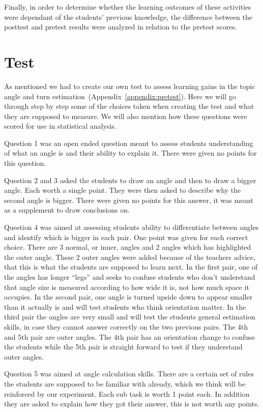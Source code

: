 \bigskip\noindent
Finally, in order to determine whether the learning outcomes of these activities were dependant of the students' previous knowledge, the difference between the posttest and pretest results were analyzed in relation to the pretest scores.

\section{Test}
As mentioned we had to create our own test to assess learning gains in the topic angle and turn estimation~(Appendix~\ref{appendix:pretest}). Here we will go through step by step some of the choices taken when creating the test and what they are supposed to measure. We will also mention how these questions were scored for use in statistical analysis. 

\bigskip\noindent
Question 1 was an open ended question meant to assess students understanding of what an angle is and their ability to explain it. There were given no points for this question.

\bigskip\noindent
Question 2 and 3 asked the students to draw an angle and then to draw a bigger angle. Each worth a single point. They were then asked to describe why the second angle is bigger. There were given no points 
for this answer, it was meant as a supplement to draw conclusions on.

\bigskip\noindent
Question 4 was aimed at assessing students ability to differentiate between angles and identify which is bigger in each pair. One point was given for each correct choice. There are 3 normal, or inner, angles and 2 angles which has highlighted the outer angle. These 2 outer angles were added because of the teachers advice, that this is what the students are supposed to learn next. In the first pair, one of the angles has longer "`legs"' and seeks to confuse students who don't understand that angle size is measured according to how wide it is, not how much space it occupies. In the second pair, one angle is turned upside down to appear smaller than it actually is and will test students who think orientation matter. In the third pair the angles are very small and will test the students general estimation skills, in case they cannot answer correctly on the two previous pairs. The 4th and 5th pair are outer angles. The 4th pair has an orientation change to confuse the students while the 5th pair is straight forward to test if they understand outer angles. 

\bigskip\noindent
Question 5 was aimed at angle calculation skills. There are a certain set of rules the students are supposed to be familiar with already, which we think will be reinforced by our experiment. Each sub task is worth 1 point each. In addition they are asked to explain how they got their answer, this is not worth any points.

